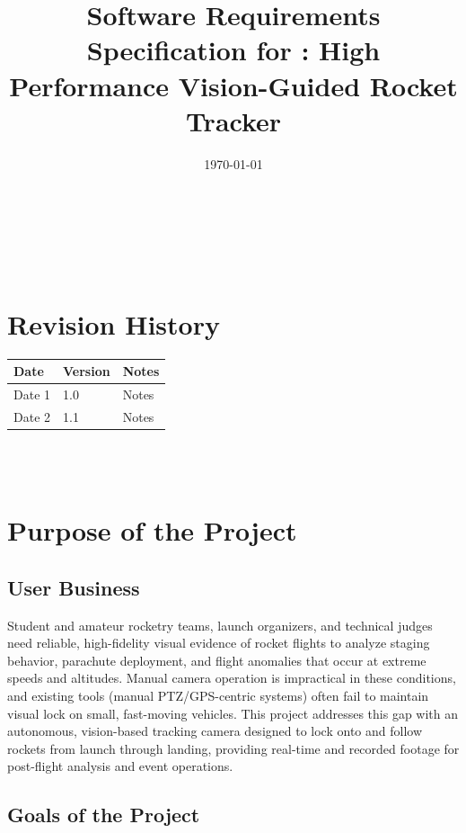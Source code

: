 \documentclass[12pt]{article}
\begin{document}
\title{Software Requirements Specification for \progname: High Performance Vision-Guided Rocket Tracker}
\author{\authname}
\date{\today}

\maketitle

~\newpage

\tableofcontents

~\newpage

\section*{Revision History}

\begin{tabularx}{\textwidth}{p{3cm}p{2cm}X}
  \toprule {\textbf{Date}} & {\textbf{Version}} & {\textbf{Notes}} \\
  \midrule
  Date 1                   & 1.0                & Notes            \\
  Date 2                   & 1.1                & Notes            \\
  \bottomrule
\end{tabularx}

~\\

~\newpage
\section{Purpose of the Project}
\subsection{User Business}

Student and amateur rocketry teams, launch organizers, and technical judges
need reliable, high-fidelity visual evidence of rocket flights to analyze
staging behavior, parachute deployment, and flight anomalies that occur at
extreme speeds and altitudes. Manual camera operation is impractical in these
conditions, and existing tools (manual PTZ/GPS-centric systems) often fail to
maintain visual lock on small, fast-moving vehicles. This project addresses
this gap with an autonomous, vision-based tracking camera designed to lock onto
and follow rockets from launch through landing, providing real-time and
recorded footage for post-flight analysis and event operations.

\subsection{Goals of the Project}
\end{document}
